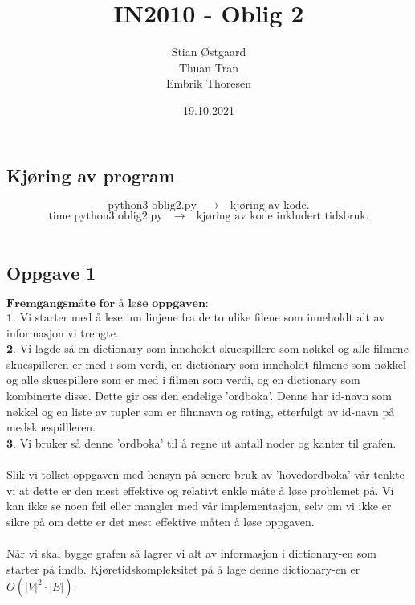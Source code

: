\documentclass[a4paper, article, oneside, norsk]{memoir} %
\title{IN2010 - Oblig 2}
\author{Stian Østgaard \\ Thuan Tran \\
Embrik Thoresen}
\date{19.10.2021}
\newcommand{\0}{\mathbf{0}}
\newcommand{\1}{\mathbf{1}}
\begin{document}
\maketitle
\subsection*{Kjøring av program}
$$
\text{python3 oblig2.py} \quad \rightarrow \quad \text{kjøring av kode.}
$$
$$
\text{time python3 oblig2.py} \quad \rightarrow \quad \text{kjøring av kode inkludert tidsbruk.}
$$
\\
\subsection*{Oppgave 1}
$\textbf{Fremgangsmåte for å løse oppgaven:}$
\\
$\mathbf{1.}$ Vi starter med å lese inn linjene fra de to ulike filene som inneholdt alt av informasjon vi trengte.
\\
$\mathbf{2.}$ Vi lagde så en dictionary som inneholdt skuespillere som nøkkel og alle filmene skuespilleren er med i som verdi, en dictionary som inneholdt filmene som nøkkel og alle skuespillere som er med i filmen som verdi, og en dictionary som kombinerte disse. Dette gir oss den endelige 'ordboka'. Denne har id-navn som nøkkel og en liste av tupler som er filmnavn og rating, etterfulgt av id-navn på medskuespillleren.
\\
$\mathbf{3.}$ Vi bruker så denne 'ordboka' til å regne ut antall noder og kanter til grafen. 
\\
\\
Slik vi tolket oppgaven med hensyn på senere bruk av 'hovedordboka' vår tenkte vi at dette er den mest effektive og relativt enkle måte å løse problemet på. Vi kan ikke se noen feil eller mangler med vår implementasjon, selv om vi ikke er sikre på om dette er det mest effektive måten å løse oppgaven.
\\
\\
Når vi skal bygge grafen så lagrer vi alt av informasjon i dictionary-en som starter på imdb. Kjøretidskompleksitet på å lage denne dictionary-en er $O(|V|^2 \cdot |E|)$.
\\
\end{document}
